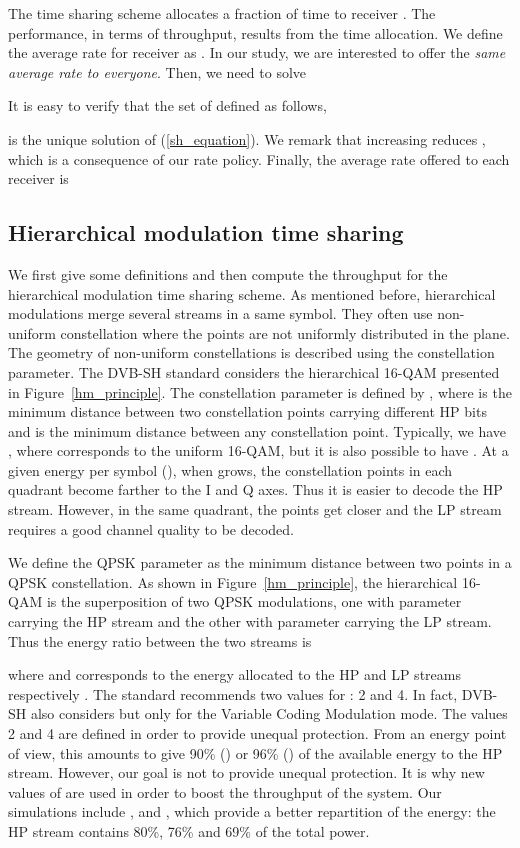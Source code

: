 \documentclass[conference, letterpaper]{IEEEtran}
\begin{document}
The time sharing scheme allocates a fraction of time  to receiver . The performance, in terms of throughput, results from the time allocation. We define the average rate for receiver  as . In our study, we are interested to offer the \emph{same average rate to everyone}. Then, we need to solve
 

It is easy to verify that the set of  defined as follows,


\noindent is the unique solution of (\ref{sh_equation}). We remark that increasing  reduces , which is a consequence of our rate policy. Finally, the average rate offered to each receiver is




\subsection{Hierarchical modulation time sharing}

We first give some definitions and then compute the throughput for the hierarchical modulation time sharing scheme. As mentioned before, hierarchical modulations merge several streams in a same symbol. They often use non-uniform constellation where the points are not  uniformly distributed in the plane. The geometry of non-uniform constellations is described using the constellation parameter. The DVB-SH standard considers the hierarchical 16-QAM presented in Figure~\ref{hm_principle}. The constellation parameter  is defined by , where  is the minimum distance between two constellation points carrying different HP bits and  is the minimum distance between any constellation point. Typically, we have , where  corresponds to the uniform 16-QAM, but it is also possible to have . At a given energy per symbol (), when  grows, the constellation points in each quadrant become farther to the I and Q axes. Thus it is easier to decode the HP stream. However, in the same quadrant, the points get closer and the LP stream requires a good channel quality to be decoded.

We define the QPSK parameter as the minimum distance between two points in a QPSK constellation. As shown in Figure~\ref{hm_principle}, the hierarchical 16-QAM is the superposition of two QPSK modulations, one with parameter  carrying the HP stream and the other with parameter  carrying the LP stream. Thus the energy ratio between the two streams is


\noindent where  and  corresponds to the energy allocated to the HP and LP streams respectively \cite{local_content}. The standard \cite{sh} recommends two values for : 2 and 4. In fact, DVB-SH also considers  but only for the Variable Coding Modulation mode. The values 2 and 4 are defined in order to provide unequal protection. From an energy point of view, this amounts to give 90\% () or 96\% () of the available energy to the HP stream. However, our goal is not to provide unequal protection. It is why new values of  are used in order to boost the throughput of the system. Our simulations include ,  and , which provide a better repartition of the energy: the HP stream contains 80\%, 76\% and 69\% of the total power. 
\end{document}
